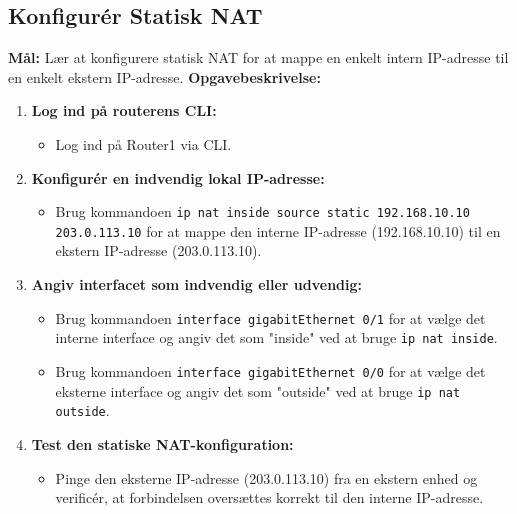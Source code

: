 \subsection{Konfigurér Statisk NAT}
\textbf{Mål:} Lær at konfigurere statisk NAT for at mappe en enkelt intern IP-adresse til en enkelt ekstern IP-adresse.
\newline\newline\noindent
\textbf{Opgavebeskrivelse:}
\begin{enumerate}
	\item \textbf{Log ind på routerens CLI:}
	\begin{itemize}
		\item Log ind på Router1 via CLI.
	\end{itemize}
	\item \textbf{Konfigurér en indvendig lokal IP-adresse:}
	\begin{itemize}
		\item Brug kommandoen \texttt{ip nat inside source static 192.168.10.10 203.0.113.10} for at mappe den interne IP-adresse (192.168.10.10) til en ekstern IP-adresse (203.0.113.10).
	\end{itemize}
	\item \textbf{Angiv interfacet som indvendig eller udvendig:}
	\begin{itemize}
		\item Brug kommandoen \texttt{interface gigabitEthernet 0/1} for at vælge det interne interface og angiv det som "inside" ved at bruge \texttt{ip nat inside}.
		\item Brug kommandoen \texttt{interface gigabitEthernet 0/0} for at vælge det eksterne interface og angiv det som "outside" ved at bruge \texttt{ip nat outside}.
	\end{itemize}
	\item \textbf{Test den statiske NAT-konfiguration:}
	\begin{itemize}
		\item Pinge den eksterne IP-adresse (203.0.113.10) fra en ekstern enhed og verificér, at forbindelsen oversættes korrekt til den interne IP-adresse.
	\end{itemize}
\end{enumerate}

